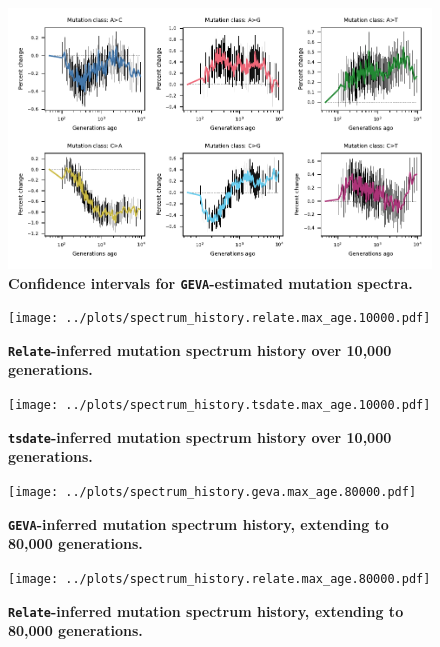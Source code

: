 \documentclass[]{article}
\newcommand{\GEVA}{\texttt{GEVA}\xspace}
\newcommand{\tsdate}{\texttt{tsdate}\xspace}
\newcommand{\relate}{\texttt{Relate}\xspace}
\begin{document}
\begin{figure}[ht!]
    \centering
    \includegraphics{../plots/ALL.error.pdf}
    \caption{
        \textbf{Confidence intervals for \GEVA-estimated mutation spectra.}
    }
    \label{fig:geva-error}
\end{figure}

\begin{figure}[ht!]
    \centering
    \texttt{[image: ../plots/spectrum\_history.relate.max\_age.10000.pdf]}
    \caption{
        \textbf{\relate-inferred mutation spectrum history over 10,000 generations.}
    }
    \label{fig:relate-spectra}
\end{figure}


\begin{figure}[ht!]
    \centering
    \texttt{[image: ../plots/spectrum\_history.tsdate.max\_age.10000.pdf]}
    \caption{
        \textbf{\tsdate-inferred mutation spectrum history over 10,000 generations.}
    }
    \label{fig:tsdate-spectra}
\end{figure}


\begin{figure}[ht!]
    \centering
    \texttt{[image: ../plots/spectrum\_history.geva.max\_age.80000.pdf]}
    \caption{
        \textbf{\GEVA-inferred mutation spectrum history, extending to 80,000 generations.}
    }
    \label{fig:geva-spectra-80k}
\end{figure}


\begin{figure}[ht!]
    \centering
    \texttt{[image: ../plots/spectrum\_history.relate.max\_age.80000.pdf]}
    \caption{
        \textbf{\relate-inferred mutation spectrum history, extending to 80,000 generations.}
    }
    \label{fig:geva-spectra-80k}
\end{figure}
\end{document}
